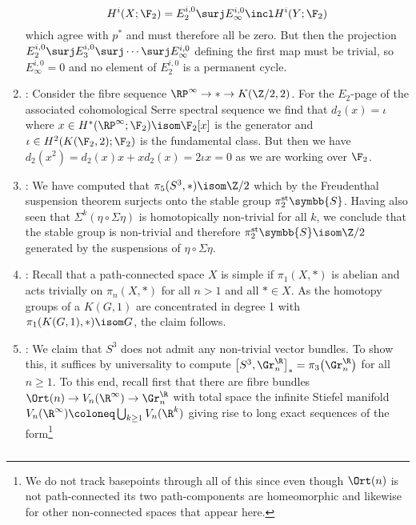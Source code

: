 \begin{answers}
\begin{enumerate}
			\begin{equation*}
				H^i(X; \F_2) = E_2^{i, 0} \surj E_\infty^{i, 0} \incl H^i(Y; \F_2)
			\end{equation*}
			which agree with $p^*$ and must therefore all be zero.
			But then the projection $E_2^{i, 0} \surj E_3^{i, 0} \surj \cdots \surj E_\infty^{i, 0}$ defining the first map must be trivial, so $E_\infty^{i, 0} = 0$ and no element of $E_2^{i, 0}$ is a permanent cycle.
		\item {}: Consider the fibre sequence $\RP^\infty \to * \to K(\Zn{2}, 2)$.
			For the $E_2$-page of the associated cohomological Serre spectral sequence we find that $d_2(x) = \iota$ where $x \in H^*(\RP^\infty; \F_2) \isom \F_2[x]$ is the generator and $\iota \in H^2(K(\F_2, 2); \F_2)$ is the fundamental class.
			But then we have $d_2(x^2) = d_2(x) x + x d_2(x) = 2 \iota x = 0$ as we are working over $\F_2$.
		\item {}: We have computed that $\pi_5(S^3, *) \isom \Zn{2}$ which by the Freudenthal suspension theorem surjects onto the stable group $\pi^{\mathrm{st}}_2 \symbb{S}$.
			Having also seen that $\Sigma^k(\eta \circ \Sigma \eta)$ is homotopically non-trivial for all $k$, we conclude that the stable group is non-trivial and therefore $\pi^{\mathrm{st}}_2 \symbb{S} \isom \Zn{2}$ generated by the suspensions of $\eta \circ \Sigma \eta$.
		\item {}: Recall that a path-connected space $X$ is simple if $\pi_1(X, *)$ is abelian and acts trivially on $\pi_n(X, *)$ for all $n > 1$ and all $* \in X$.
			As the homotopy groups of a $K(G, 1)$ are concentrated in degree 1 with $\pi_1(K(G, 1), *) \isom G$, the claim follows.
		\item {}: We claim that $S^3$ does not admit any non-trivial vector bundles.
			To show this, it suffices by universality to compute $\big[S^3, \Gr_n^\R\big]_* = \pi_3\big(\Gr_n^\R\big)$ for all $n \geq 1$.
			To this end, recall first that there are fibre bundles $\Ort(n) \to V_n(\R^\infty) \to \Gr_n^\R$ with total space the infinite Stiefel manifold $V_n(\R^\infty) \coloneq \bigcup_{k \geq 1} V_n(\R^k)$ giving rise to long exact sequences of the form\footnote{We do not track basepoints through all of this since even though $\Ort(n)$ is not path-connected its two path-components are homeomorphic and likewise for other non-connected spaces that appear here.}
			\begin{equation*}
				\begin{tikzcd}[column sep = small]

\end{tikzcd}
\end{equation*}
\end{enumerate}
\end{answers}
